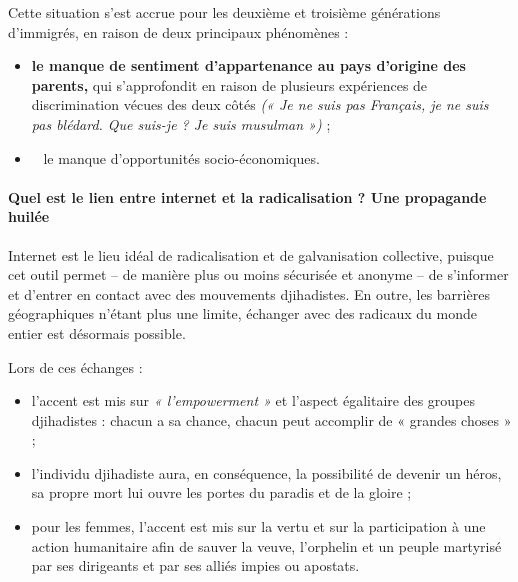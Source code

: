 Cette situation s'est accrue pour les deuxième et troisième générations
d'immigrés, en raison de deux principaux phénomènes :


\begin{itemize}
\item
  
  \textbf{le manque de sentiment d'appartenance au pays d'origine des
  parents,} qui s'approfondit en raison de plusieurs expériences de
  discrimination vécues des deux côtés \emph{(« Je ne suis pas Français,
  je ne suis pas blédard. Que suis-je ? Je suis musulman »)} ;
  
\item ~
  le manque d'opportunités socio-économiques.
\end{itemize}

\paragraph{Quel est le lien entre internet et la radicalisation ? Une
  propagande huilée}



Internet est le l{ieu idéal de radicalisation et de galvanisation
collective,} puisque cet outil permet -- de manière plus ou moins
sécurisée et anonyme -- de s'informer et d'entrer en contact avec des
mouvements djihadistes. En outre, les barrières géographiques n'étant
plus une limite, échanger avec des radicaux du monde entier est
désormais possible.

Lors de ces échanges :


\begin{itemize}
\item
  
  l'accent est mis sur {\emph{« l'empowerment »} et l'aspect
  égalitaire des groupes djihadistes :} chacun a sa chance, chacun peut
  accomplir de « grandes choses » ;
  
\item
  
  l'individu djihadiste aura, en conséquence, la possibilité de devenir
  un héros, sa propre mort lui ouvre les portes du paradis et de la
  gloire ;
  
\item
  
  pour les femmes, l'accent est mis sur la vertu et sur la participation
  à une {action humanitaire} afin de sauver la veuve, l'orphelin
  et un peuple martyrisé par ses dirigeants et par ses alliés impies ou
  apostats.
  
\end{itemize}


